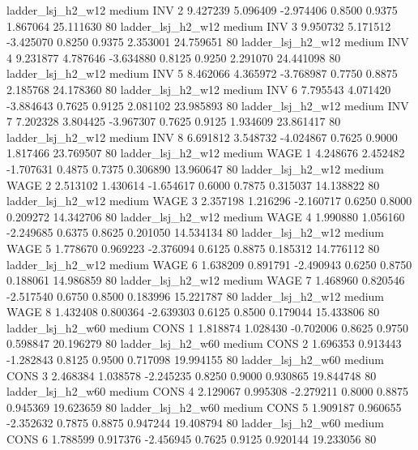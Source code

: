      ladder_lsj_h2_w12     medium      INV                 2  9.427239 5.096409 -2.974406 0.8500 0.9375  1.867064   25.111630 80
     ladder_lsj_h2_w12     medium      INV                 3  9.950732 5.171512 -3.425070 0.8250 0.9375  2.353001   24.759651 80
     ladder_lsj_h2_w12     medium      INV                 4  9.231877 4.787646 -3.634880 0.8125 0.9250  2.291070   24.441098 80
     ladder_lsj_h2_w12     medium      INV                 5  8.462066 4.365972 -3.768987 0.7750 0.8875  2.185768   24.178360 80
     ladder_lsj_h2_w12     medium      INV                 6  7.795543 4.071420 -3.884643 0.7625 0.9125  2.081102   23.985893 80
     ladder_lsj_h2_w12     medium      INV                 7  7.202328 3.804425 -3.967307 0.7625 0.9125  1.934609   23.861417 80
     ladder_lsj_h2_w12     medium      INV                 8  6.691812 3.548732 -4.024867 0.7625 0.9000  1.817466   23.769507 80
     ladder_lsj_h2_w12     medium     WAGE                 1  4.248676 2.452482 -1.707631 0.4875 0.7375  0.306890   13.960647 80
     ladder_lsj_h2_w12     medium     WAGE                 2  2.513102 1.430614 -1.654617 0.6000 0.7875  0.315037   14.138822 80
     ladder_lsj_h2_w12     medium     WAGE                 3  2.357198 1.216296 -2.160717 0.6250 0.8000  0.209272   14.342706 80
     ladder_lsj_h2_w12     medium     WAGE                 4  1.990880 1.056160 -2.249685 0.6375 0.8625  0.201050   14.534134 80
     ladder_lsj_h2_w12     medium     WAGE                 5  1.778670 0.969223 -2.376094 0.6125 0.8875  0.185312   14.776112 80
     ladder_lsj_h2_w12     medium     WAGE                 6  1.638209 0.891791 -2.490943 0.6250 0.8750  0.188061   14.986859 80
     ladder_lsj_h2_w12     medium     WAGE                 7  1.468960 0.820546 -2.517540 0.6750 0.8500  0.183996   15.221787 80
     ladder_lsj_h2_w12     medium     WAGE                 8  1.432408 0.800364 -2.639303 0.6125 0.8500  0.179044   15.433806 80
     ladder_lsj_h2_w60     medium     CONS                 1  1.818874 1.028430 -0.702006 0.8625 0.9750  0.598847   20.196279 80
     ladder_lsj_h2_w60     medium     CONS                 2  1.696353 0.913443 -1.282843 0.8125 0.9500  0.717098   19.994155 80
     ladder_lsj_h2_w60     medium     CONS                 3  2.468384 1.038578 -2.245235 0.8250 0.9000  0.930865   19.844748 80
     ladder_lsj_h2_w60     medium     CONS                 4  2.129067 0.995308 -2.279211 0.8000 0.8875  0.945369   19.623659 80
     ladder_lsj_h2_w60     medium     CONS                 5  1.909187 0.960655 -2.352632 0.7875 0.8875  0.947244   19.408794 80
     ladder_lsj_h2_w60     medium     CONS                 6  1.788599 0.917376 -2.456945 0.7625 0.9125  0.920144   19.233056 80
